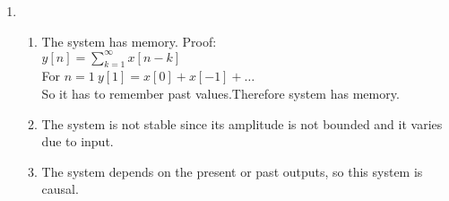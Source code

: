 \documentclass[10pt,a4paper, margin=1in]{article}
\begin{document}
\begin{enumerate}
\begin{enumerate}
\begin{enumerate}
        \end{enumerate} 
    \item %
    \begin{enumerate}
        \item The system has memory. Proof:\\
        \(y[n]=\)\(\sum_{k=1}^{\infty}x[n-k]\)\\
        For \(n=1\ y[1]=x[0]+x[-1]+\dots \)\\ So it has to remember past values.Therefore system has memory.
        \item The system is not stable since its amplitude is not bounded and it varies due to input.
        \item The system depends on the present or past outputs, so this system is causal.
        
        \end{enumerate}
    \end{enumerate}
    
\end{enumerate}
\end{document}
